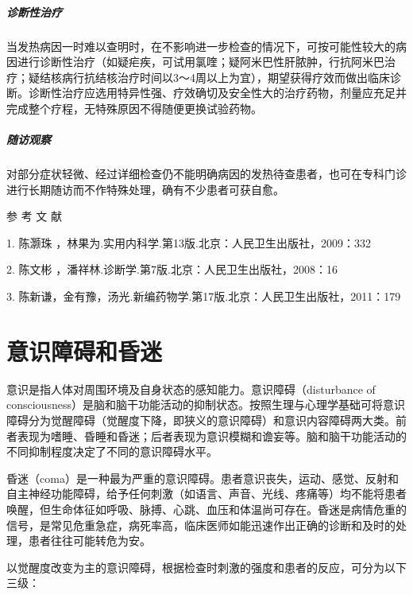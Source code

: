 \paragraph{诊断性治疗}

当发热病因一时难以查明时，在不影响进一步检查的情况下，可按可能性较大的病因进行诊断性治疗（如疑疟疾，可试用氯喹；疑阿米巴性肝脓肿，行抗阿米巴治疗；疑结核病行抗结核治疗时间以3～4周以上为宜），期望获得疗效而做出临床诊断。诊断性治疗应选用特异性强、疗效确切及安全性大的治疗药物，剂量应充足并完成整个疗程，无特殊原因不得随便更换试验药物。

\paragraph{随访观察}

对部分症状轻微、经过详细检查仍不能明确病因的发热待查患者，也可在专科门诊进行长期随访而不作特殊处理，确有不少患者可获自愈。

\protect\hypertarget{text00009.html}{}{}

\hypertarget{text00009.htmlux5cux23CHP1-1-4}{}
参 考 文 献

1. 陈灏珠 ，林果为.实用内科学.第13版.北京：人民卫生出版社，2009：332

2. 陈文彬 ，潘祥林.诊断学.第7版.北京：人民卫生出版社，2008：16

3.
陈新谦，金有豫，汤光.新编药物学.第17版.北京：人民卫生出版社，2011：179

\protect\hypertarget{text00010.html}{}{}

\chapter{意识障碍和昏迷}

意识是指人体对周围环境及自身状态的感知能力。意识障碍（disturbance of
consciousness）是脑和脑干功能活动的抑制状态。按照生理与心理学基础可将意识障碍分为觉醒障碍（觉醒度下降，即狭义的意识障碍）和意识内容障碍两大类。前者表现为嗜睡、昏睡和昏迷；后者表现为意识模糊和谵妄等。脑和脑干功能活动的不同抑制程度决定了不同的意识障碍水平。

昏迷（coma）是一种最为严重的意识障碍。患者意识丧失，运动、感觉、反射和自主神经功能障碍，给予任何刺激（如语言、声音、光线、疼痛等）均不能将患者唤醒，但生命体征如呼吸、脉搏、心跳、血压和体温尚可存在。昏迷是病情危重的信号，是常见危重急症，病死率高，临床医师如能迅速作出正确的诊断和及时的处理，患者往往可能转危为安。

以觉醒度改变为主的意识障碍，根据检查时刺激的强度和患者的反应，可分为以下三级：


